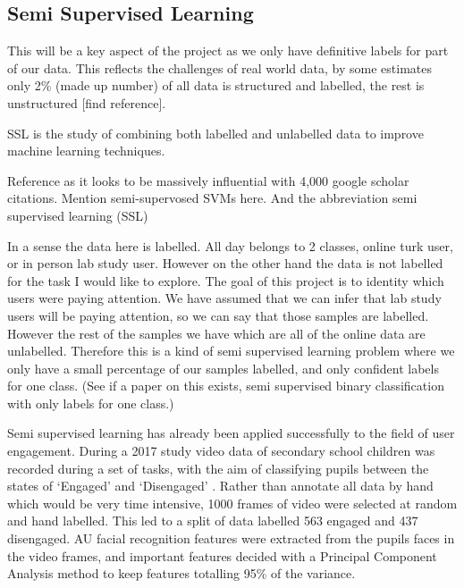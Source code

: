 \documentclass{article}
\begin{document}


\subsection{Semi Supervised Learning}
This will be a key aspect of the project as we only have definitive labels for part of our data.
This reflects the challenges of real world data, by some estimates only 2\% (made up number) of all data is structured and labelled, the rest is unstructured [find reference].

SSL is the study of combining both labelled and unlabelled data to improve machine learning techniques.

Reference \cite{zhu2005semi} as it looks to be massively influential with 4,000 google scholar citations.
Mention semi-supervosed SVMs here. 
And the abbreviation semi supervised learning (SSL)


In a sense the data here is labelled.
All day belongs to 2 classes, online turk user, or in person lab study user.
However on the other hand the data is not labelled for the task I would like to explore.
The goal of this project is to identity which users were paying attention.
We have assumed that we can infer that lab study users will be paying attention, so we can say that those samples are labelled.
However the rest of the samples we have which are all of the online data are unlabelled.
Therefore this is a kind of semi supervised learning problem where we only have a small percentage of our samples labelled, and only confident labels for one class.
(See if a paper on this exists, semi supervised binary classification with only labels for one class.)

Semi supervised learning has already been applied successfully to the field of user engagement.
During a 2017 study video data of secondary school children was recorded during a set of tasks, with the aim of classifying pupils between the states of `Engaged' and `Disengaged' \cite{nezami2017semi}.
Rather than annotate all data by hand which would be very time intensive, 1000 frames of video were selected at random and hand labelled.
This led to a split of data labelled 563 engaged and 437 disengaged.
AU facial recognition features were extracted from the pupils faces in the video frames, and important features decided with a Principal Component Analysis method to keep features totalling 95\% of the variance.
\end{document}
